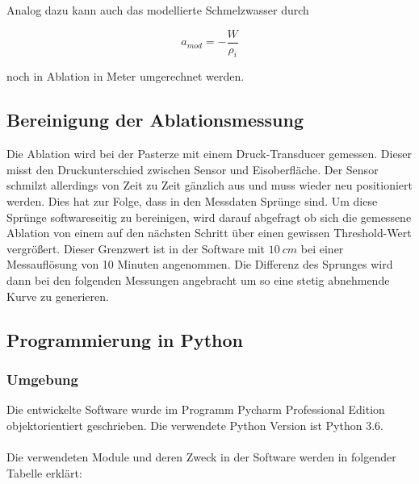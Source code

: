 \documentclass[12pt,a4paper]{article}
\begin{document}
Analog dazu kann auch das modellierte Schmelzwasser durch

\begin{equation}
a_{mod} = -\frac{W}{\rho_{i}}
\end{equation}

noch in Ablation in Meter umgerechnet werden.

\subsection{Bereinigung der Ablationsmessung}
Die Ablation wird bei der Pasterze mit einem Druck-Transducer gemessen. Dieser misst den Druckunterschied zwischen Sensor und Eisoberfläche. Der Sensor schmilzt allerdings von Zeit zu Zeit gänzlich aus und muss wieder neu positioniert werden. Dies hat zur Folge, dass in den Messdaten Sprünge sind. Um diese Sprünge softwareseitig zu bereinigen, wird darauf abgefragt ob sich die gemessene Ablation von einem auf den nächsten Schritt über einen gewissen Threshold-Wert vergrößert. Dieser Grenzwert ist in der Software mit $10~cm$ bei einer Messauflösung von 10 Minuten angenommen. Die Differenz des Sprunges wird dann bei den folgenden Messungen angebracht um so eine stetig abnehmende Kurve zu generieren.



\subsection{Programmierung in Python}
\subsubsection{Umgebung}

Die entwickelte Software wurde im Programm Pycharm Professional Edition objektorientiert geschrieben. Die verwendete Python Version ist Python 3.6.\\\\
Die verwendeten Module und deren Zweck in der Software werden in folgender Tabelle erklärt:
\end{document}
